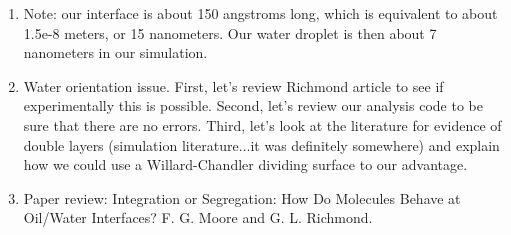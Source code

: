 \documentclass[12pt,reqno]{amsart}
\numberwithin{equation}{section}
\begin{document}
\begin{enumerate}
\item Note: our interface is about 150 angstroms long, which is equivalent to about 1.5e-8 meters, or 15 nanometers.  Our water droplet is then about 7 nanometers in our simulation.  


\item Water orientation issue.  First, let's review Richmond article to see if experimentally this is possible.  Second, let's review our analysis code to be sure that there are no errors.  Third, let's look at the literature for evidence of double layers (simulation literature...it was definitely somewhere) and explain how we could use a Willard-Chandler dividing surface to our advantage.

\item Paper review:  Integration or Segregation: How Do Molecules Behave at Oil/Water Interfaces?  F. G. Moore and G. L. Richmond.  

\end{enumerate}
\end{document}
